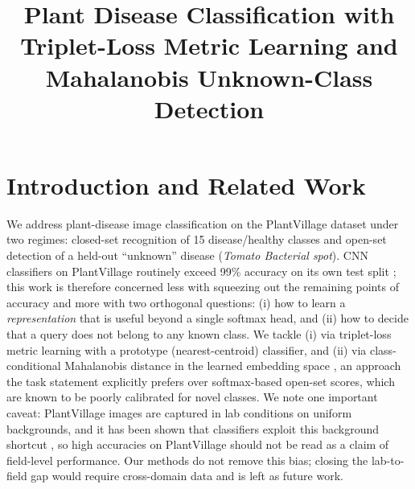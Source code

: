 \documentclass[pdflatex,sn-mathphys-num]{sn-jnl}
\begin{document}
\title[Plant Disease Classification with Triplet Loss]{Plant Disease Classification with Triplet-Loss Metric Learning and Mahalanobis Unknown-Class Detection}

\author*[1]{ }
\author[1]{ }
\author[1]{ }
\author[1]{ }


\maketitle

\section{Introduction and Related Work}\label{sec:intro}

We address plant-disease image classification on the PlantVillage dataset \cite{mohanty2016using} under two regimes: closed-set recognition of 15 disease/healthy classes and open-set detection of a held-out ``unknown'' disease (\textit{Tomato Bacterial spot}). CNN classifiers on PlantVillage routinely exceed 99\% accuracy on its own test split \cite{ferentinos2018deep}; this work is therefore concerned less with squeezing out the remaining points of accuracy and more with two orthogonal questions: (i) how to learn a \emph{representation} that is useful beyond a single softmax head, and (ii) how to decide that a query does not belong to any known class. We tackle (i) via triplet-loss metric learning \cite{schroff2015facenet,hermans2017defense} with a prototype (nearest-centroid) classifier, and (ii) via class-conditional Mahalanobis distance in the learned embedding space \cite{lee2018simple}, an approach the task statement explicitly prefers over softmax-based open-set scores, which are known to be poorly calibrated for novel classes. We note one important caveat: PlantVillage images are captured in lab conditions on uniform backgrounds, and it has been shown that classifiers exploit this background shortcut \cite{noyan2022uncovering}, so high accuracies on PlantVillage should not be read as a claim of field-level performance. Our methods do not remove this bias; closing the lab-to-field gap would require cross-domain data and is left as future work.
\end{document}

